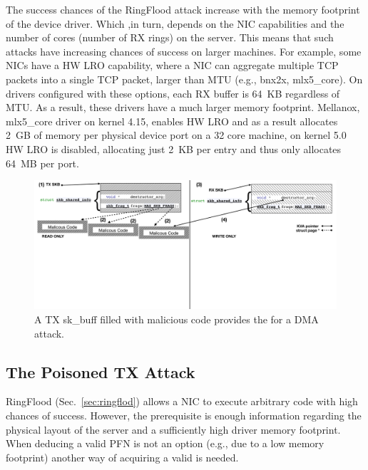 The success chances of the RingFlood attack increase with the memory footprint of the device driver. Which ,in turn, depends on the NIC capabilities and the number of cores (number of RX rings) on the server. This means that such attacks have increasing chances of success on larger machines. 
For example, some NICs have a HW LRO capability\cite{mlx5_lro}, where a NIC can aggregate multiple TCP packets into a single TCP packet, larger than MTU (e.g., bnx2x, mlx5\_core). On drivers configured with these options, each RX buffer is 64~KB regardless of MTU. As a result, these drivers have a much larger memory footprint. Mellanox, mlx5\_core driver on kernel 4.15, enables HW LRO and as a result allocates 2~GB of memory per physical device port on a 32 core machine, on kernel 5.0 HW LRO is disabled, allocating just 2~KB per entry and thus only allocates 64~MB per port.

\begin{figure}[t]
    \centering
    \includegraphics[width=0.8\linewidth]{figs/accomplice.pdf}
    \caption{A TX sk\_buff filled with malicious code provides the \kva for a DMA attack.}
    \label{fig:payload}
\end{figure}
\subsection{The Poisoned TX \Compound{} Attack}\label{sec:posion}

RingFlood (Sec.~\ref{sec:ringflod}) allows a NIC to execute arbitrary code with high chances of success. However, the prerequisite is enough information regarding the physical layout of the server and a sufficiently high driver memory footprint. When deducing a valid PFN is not an option (e.g., due to a low memory footprint) another way of acquiring a valid \kva{} is needed.

